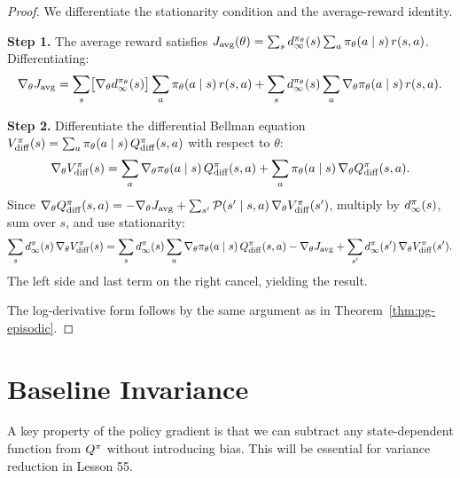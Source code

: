 \documentclass[11pt,a4paper]{article}
\begin{document}
\begin{proof}
We differentiate the stationarity condition and the average-reward
identity.

\textbf{Step 1.} The average reward satisfies
$J_{\mathrm{avg}}(\theta) = \sum_s d^{\pi_\theta}_{\infty}(s)
\sum_a \pi_\theta(a \mid s)\, r(s,a)$. Differentiating:
\begin{equation}
\label{eq:avg-grad-start}
  \nabla_\theta J_{\mathrm{avg}}
  = \sum_s \bigl[\nabla_\theta d^{\pi_\theta}_{\infty}(s)\bigr]
    \sum_a \pi_\theta(a \mid s)\, r(s,a)
  + \sum_s d^{\pi_\theta}_{\infty}(s) \sum_a
    \nabla_\theta \pi_\theta(a \mid s)\, r(s,a).
\end{equation}

\textbf{Step 2.} Differentiate the differential Bellman equation
$V^{\pi}_{\mathrm{diff}}(s) = \sum_a \pi_\theta(a\mid s)\,
Q^{\pi}_{\mathrm{diff}}(s,a)$ with respect to $\theta$:
\[
  \nabla_\theta V^{\pi}_{\mathrm{diff}}(s)
  = \sum_a \nabla_\theta \pi_\theta(a\mid s)\, Q^{\pi}_{\mathrm{diff}}(s,a)
  + \sum_a \pi_\theta(a\mid s)\, \nabla_\theta Q^{\pi}_{\mathrm{diff}}(s,a).
\]
Since $\nabla_\theta Q^{\pi}_{\mathrm{diff}}(s,a)
= -\nabla_\theta J_{\mathrm{avg}} + \sum_{s'} \mathcal{P}(s'\mid s,a)\,
\nabla_\theta V^{\pi}_{\mathrm{diff}}(s')$, multiply by
$d^{\pi}_\infty(s)$, sum over $s$, and use stationarity:
\[
  \sum_s d^{\pi}_\infty(s)\, \nabla_\theta V^{\pi}_{\mathrm{diff}}(s)
  = \sum_s d^{\pi}_\infty(s) \sum_a \nabla_\theta \pi_\theta(a\mid s)\,
    Q^{\pi}_{\mathrm{diff}}(s,a)
  - \nabla_\theta J_{\mathrm{avg}}
  + \sum_{s'} d^{\pi}_\infty(s')\, \nabla_\theta V^{\pi}_{\mathrm{diff}}(s').
\]
The left side and last term on the right cancel, yielding the result.

The log-derivative form follows by the same argument as in
Theorem~\ref{thm:pg-episodic}.
\end{proof}

\section{Baseline Invariance}

A key property of the policy gradient is that we can subtract any
state-dependent function from $Q^{\pi}$ without introducing bias. This will
be essential for variance reduction in Lesson 55.
\end{document}
